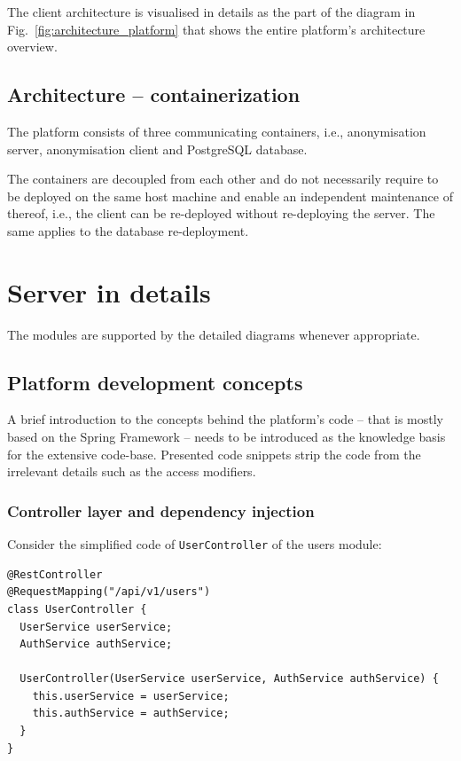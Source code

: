 \documentclass[a4paper,twoside,12pt]{book}
\begin{document}
The client architecture is visualised in details as the part of the diagram in Fig.~\ref{fig:architecture_platform} that shows the entire platform's architecture overview.

\subsection{Architecture -- containerization}

The platform consists of three communicating containers, i.e., anonymisation server, anonymisation client and PostgreSQL database.

The containers are decoupled from each other and do not necessarily require to be deployed on the same host machine and enable an independent maintenance of thereof, i.e., the client can be re-deployed without re-deploying the server. The same applies to the database re-deployment.

\section{Server in details}

The modules are supported by the detailed diagrams whenever appropriate.

\subsection{Platform development concepts}

A brief introduction to the concepts behind the platform's code -- that is mostly based on the Spring Framework -- needs to be introduced as the knowledge basis for the extensive code-base. Presented code snippets strip the code from the irrelevant details such as the access modifiers.

\subsubsection{Controller layer and dependency injection}

Consider the simplified code of \texttt{UserController} of the users module:

\begin{verbatim}
@RestController
@RequestMapping("/api/v1/users")
class UserController {
  UserService userService;
  AuthService authService;

  UserController(UserService userService, AuthService authService) {
    this.userService = userService;
    this.authService = authService;
  }
}
\end{verbatim}
\end{document}

